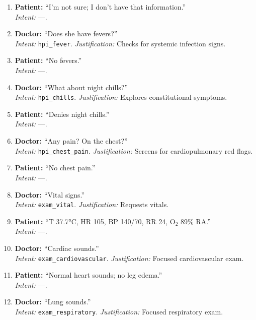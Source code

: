 \begin{enumerate}
  \item \textbf{Patient:} ``I'm not sure; I don't have that information.'' \\
  \emph{Intent:} ---.

  \item \textbf{Doctor:} ``Does she have fevers?'' \\
  \emph{Intent:} \texttt{hpi\_fever}. \emph{Justification:} Checks for systemic infection signs.

  \item \textbf{Patient:} ``No fevers.'' \\
  \emph{Intent:} ---.

  \item \textbf{Doctor:} ``What about night chills?'' \\
  \emph{Intent:} \texttt{hpi\_chills}. \emph{Justification:} Explores constitutional symptoms.

  \item \textbf{Patient:} ``Denies night chills.'' \\
  \emph{Intent:} ---.

  \item \textbf{Doctor:} ``Any pain? On the chest?'' \\
  \emph{Intent:} \texttt{hpi\_chest\_pain}. \emph{Justification:} Screens for cardiopulmonary red flags.

  \item \textbf{Patient:} ``No chest pain.'' \\
  \emph{Intent:} ---.

  \item \textbf{Doctor:} ``Vital signs.'' \\
  \emph{Intent:} \texttt{exam\_vital}. \emph{Justification:} Requests vitals.

  \item \textbf{Patient:} ``T 37.7°C, HR 105, BP 140/70, RR 24, O$_2$ 89\% RA.'' \\
  \emph{Intent:} ---.

  \item \textbf{Doctor:} ``Cardiac sounds.'' \\
  \emph{Intent:} \texttt{exam\_cardiovascular}. \emph{Justification:} Focused cardiovascular exam.

  \item \textbf{Patient:} ``Normal heart sounds; no leg edema.'' \\
  \emph{Intent:} ---.

  \item \textbf{Doctor:} ``Lung sounds.'' \\
  \emph{Intent:} \texttt{exam\_respiratory}. \emph{Justification:} Focused respiratory exam.


\end{enumerate}
